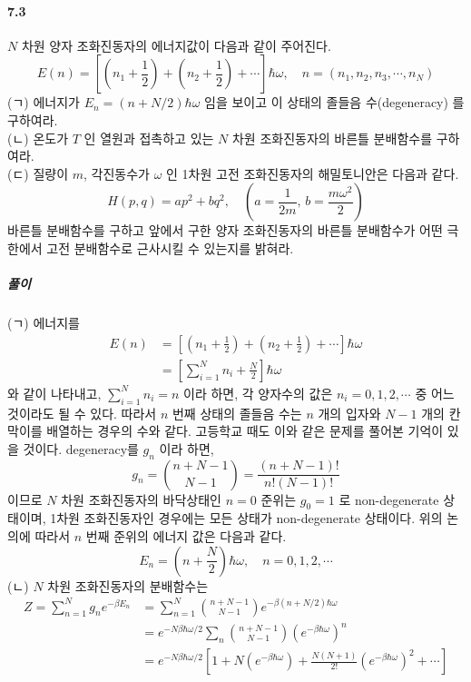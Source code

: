 \documentclass[a4paper,12pt]{report}
\begin{document}
	\paragraph{7.3 } $N$ 차원 양자 조화진동자의 에너지값이 다음과 같이 주어진다. 
	$$E(n)=\left[\left(n_1+\frac{1}{2} \right) +\left(n_2+\frac{1}{2} \right) +\cdots \right]\hbar\omega,\quad n=(n_1,n_2,n_3,\cdots,n_N)  $$
	(ㄱ) 에너지가 $E_n=(n+N/2)\hbar\omega$ 임을 보이고 이 상태의 졸들음 수(degeneracy) 를 구하여라.\\
	(ㄴ) 온도가 $T$ 인 열원과 접촉하고 있는 $N$ 차원 조화진동자의 바른틀 분배함수를 구하여라.\\
	(ㄷ) 질량이 $m$, 각진동수가 $\omega$ 인 1차원 고전 조화진동자의 해밀토니안은 다음과 같다.
	$$H(p,q)=ap^2+bq^2,\quad \left(a=\frac{1}{2m},\,b=\frac{m\omega^2}{2} \right) $$
	바른틀 분배함수를 구하고 앞에서 구한 양자 조화진동자의 바른틀 분배함수가 어떤 극한에서 고전 분배함수로 근사시킬 수 있는지를 밝혀라.
	\subparagraph{풀이} (ㄱ) 에너지를 
	\begin{equation*}
		\begin{split}
		E(n)&=\left[\left(n_1+\frac{1}{2} \right) +\left(n_2+\frac{1}{2} \right) +\cdots \right]\hbar\omega\\
		&=\left[\sum_{i=1}^{N}n_i+\frac{N}{2}\right]\hbar\omega
		\end{split}
	\end{equation*}
	와 같이 나타내고, $\sum_{i=1}^Nn_i=n$ 이라 하면, 각 양자수의 값은 $n_i=0,1,2,\cdots$ 중 어느 것이라도 될 수 있다. 따라서 $n$ 번째 상태의 졸들음 수는 $n$ 개의 입자와 $N-1$ 개의 칸막이를 배열하는 경우의 수와 같다. 고등학교 때도 이와 같은 문제를 풀어본 기억이 있을 것이다. degeneracy를 $g_n$ 이라 하면,
	$$g_n={n+N-1\choose N-1}=\frac{(n+N-1)!}{n!(N-1)!}$$ 이므로
	 $N$ 차원 조화진동자의 바닥상태인 $n=0$ 준위는 $g_0=1$ 로 non-degenerate 상태이며, 1차원 조화진동자인 경우에는 모든 상태가 non-degenerate 상태이다. 위의 논의에 따라서 $n$ 번째 준위의 에너지 값은 다음과 같다.
	 $$E_n=\left(n+\frac{N}{2} \right)\hbar\omega,\quad n=0,1,2,\cdots $$
	 (ㄴ) $N$ 차원 조화진동자의 분배함수는 
	 \begin{equation*}
	 	\begin{split}
	 	Z=\sum_{n=1}^{N}g_ne^{-\beta E_n}&=\sum_{n=1}^{N}{n+N-1\choose N-1}e^{-\beta(n+N/2)\hbar\omega}\\
	 	&=e^{-N\beta\hbar\omega/2}\sum_{n}{n+N-1\choose N-1}(e^{-\beta\hbar\omega})^n\\
	 	&=e^{-N\beta\hbar\omega/2}\left[1+N(e^{-\beta\hbar\omega})+\frac{N(N+1)}{2!}(e^{-\beta\hbar\omega})^2+\cdots \right] 
	 	\end{split}
	 \end{equation*}
\end{document}
